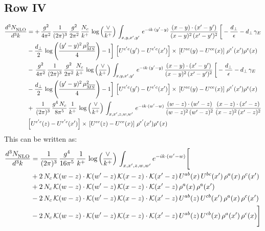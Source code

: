 \documentclass[9pt]{article}
\numberwithin{equation}{section}
\begin{document}
\subsection{Row IV}
\begin{align}
    \frac{d^{3}N_{\rm NLO}^{\rm}}{d^{3}k}  & =    +\, \frac{g^{2}}{4\pi^{2}}\, \frac{1}{(2\pi)^{3}}\,\frac{g^{2}}{2\pi^{2}}\, \frac{N_{c}}{k^{+}}\,\log{\left(\frac{\vee}{k^{+}}\right)}\,\int_{x,y,x',y'}\,e^{-ik\cdot (y'-y)}\,\frac{(x-y)\cdot (x'-y')}{(x-y)^{2}\,(x'-y')^{2}}\,\bigg[-\frac{d_{\perp}}{\epsilon}-d_{\perp}\,\gamma_{E}\notag \\ & -\frac{d_{\perp}}{2}\,\log{\left(\frac{(y'-y)^{2}\,\mu^{2}_{\overline{MS}}}{4}\right)}-1\bigg]\,\left[U^{e'c}(y') - U^{e'c}(x')\right] \times\, \left[U^{ec}(y) - U^{ce}(x)\right]\, \rho^{e'}(x') \rho^{e}(x) \notag \\
&   -\, \frac{g^{2}}{4\pi^{2}}\, \frac{1}{(2\pi)^{3}}\,\frac{g^{2}}{2\pi^{2}}\, \frac{N_{c}}{k^{+}}\,\log{\left(\frac{\vee}{k^{+}}\right)}\,\int_{x,y,x',y'}\,e^{-ik\cdot (y'-y)}\,\frac{(x-y)\cdot (x'-y')}{(x-y)^{2}\,(x'-y')^{2}}\,\bigg[-\frac{d_{\perp}}{\epsilon}-d_{\perp}\,\gamma_{E}\notag \\ &   -\frac{d_{\perp}}{2}\,\log{\left(\frac{(y'-y)^{2}\,\mu^{2}_{\overline{MS}}}{4}\right)}-1\bigg]\,\left[U^{e'c}(y') - U^{e'c}(x')\right] \times\, \left[U^{ec}(y) - U^{ce}(x)\right]\, \rho^{e'}(x') \rho^{e}(x) \notag \\
&   +\,\frac{1}{(2\pi)^{3}}\,\frac{g^{4}\,N_{c}}{8\pi^{5}}\,\frac{1}{k^{+}}\,\log{\left(\frac{\vee}{k^{+}}\right)}\,\int_{x,x',z,w,w'}\,e^{-ik\cdot (w'-w)}\,\frac{(w-z)\cdot(w'-z)}{(w-z)^{2}\,(w'-z)^{2}}\,\frac{(x-z)\cdot(x'-z)}{(x-z)^{2}\,(x'-z)^{2}}\notag \\ &   \left[U^{e'c}(z) - U^{e'c}(x')\right] \times\, \left[U^{ec}(z) - U^{ce}(x)\right]\, \rho^{e'}(x') \rho^{e}(x)
\end{align}
This can be written as: 
\begin{align}
    \frac{d^{3}N_{\rm NLO}^{\rm}}{d^{3}k}  & = \frac{1}{(2\pi)^{3}}\,\frac{g^{4}}{16\pi^{5}}\,\frac{1}{k^{+}}\,\log{\left(\frac{\vee}{k^{+}}\right)}\, \int_{x,x',z,w,w'}e^{-ik\cdot(w'-w)}\Bigg[\notag\\ & +2\,N_{c}\,\mathcal{K}(w-z)\cdot\mathcal{K}(w'-z)\,\mathcal{K}(x-z)\cdot\mathcal{K}(x'-z)\,U^{ab}(x)\,U^{bc}(x')\,\rho^{a}(x)\,\rho^{c}(x')\notag \\ 
&+2\,N_{c}\,\mathcal{K}(w-z)\cdot\mathcal{K}(w'-z)\,\mathcal{K}(x-z)\cdot\mathcal{K}(x'-z)\,\rho^{a}(x)\,\rho^{a}(x')\notag \\ 
&-2\,N_{c}\,\mathcal{K}(w-z)\cdot\mathcal{K}(w'-z)\,\mathcal{K}(x-z)\cdot\mathcal{K}(x'-z)\,U^{ab}(z)\,U^{cb}(x')\,\rho^{a}(x)\,\rho^{c}(x')\notag \\ 
&-2\,N_{c}\,\mathcal{K}(w-z)\cdot\mathcal{K}(w'-z)\,\mathcal{K}(x-z)\cdot\mathcal{K}(x'-z)\,U^{ab}(z)\,U^{cb}(x)\,\rho^{a}(x')\,\rho^{c}(x)\Bigg]
\end{align}
\end{document}
